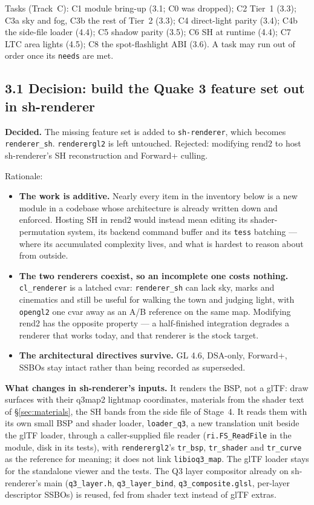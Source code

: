 \documentclass[11pt,a4paper]{article}
\begin{document}
Tasks (Track~C): C1 module bring-up (3.1; C0 was dropped); C2 Tier~1 (3.3); C3a sky and fog, C3b the
rest of Tier~2 (3.3); C4 direct-light parity (3.4); C4b the side-file loader (4.4); C5 shadow parity
(3.5); C6 SH at runtime (4.4); C7 LTC area lights (4.5); C8 the spot-flashlight ABI (3.6). A task
may run out of order once its \texttt{needs} are met.

\subsection{3.1 Decision: build the Quake 3 feature set out in sh-renderer}

\textbf{Decided.} The missing feature set is added to \texttt{sh-renderer}, which becomes
\texttt{renderer\_sh}. \texttt{renderergl2} is left untouched. Rejected: modifying rend2 to host
sh-renderer's SH reconstruction and Forward+ culling.

Rationale:
\begin{itemize}
\item \textbf{The work is additive.} Nearly every item in the inventory below is a new module in a
  codebase whose architecture is already written down and enforced. Hosting SH in rend2 would
  instead mean editing its shader-permutation system, its backend command buffer and its
  \texttt{tess} batching --- where its accumulated complexity lives, and what is hardest to reason
  about from outside.
\item \textbf{The two renderers coexist, so an incomplete one costs nothing.}
  \texttt{cl\_renderer} is a latched cvar: \texttt{renderer\_sh} can lack sky, marks and
  cinematics and still be useful for walking the town and judging light, with \texttt{opengl2} one
  cvar away as an A/B reference on the same map. Modifying rend2 has the opposite property --- a
  half-finished integration degrades a renderer that works today, and that renderer is the stock
  target.
\item \textbf{The architectural directives survive.} GL 4.6, DSA-only, Forward+, SSBOs stay intact
  rather than being recorded as superseded.
\end{itemize}

\textbf{What changes in sh-renderer's inputs.} It renders the BSP, not a glTF: draw surfaces with
their q3map2 lightmap coordinates, materials from the shader text of §\ref{sec:materials}, the SH
bands from the side file of Stage~4. It reads them with its own small BSP and shader loader,
\texttt{loader\_q3}, a new translation unit beside the glTF loader, through a caller-supplied file
reader (\texttt{ri.FS\_ReadFile} in the module, disk in its tests), with \texttt{renderergl2}'s \texttt{tr\_bsp},
\texttt{tr\_shader} and \texttt{tr\_curve} as the reference for meaning; it does not link
\texttt{libioq3\_map}. The glTF loader stays for the standalone viewer and the tests. The Q3 layer
compositor already on sh-renderer's main
(\texttt{q3\_layer.h}, \texttt{q3\_layer\_bind}, \texttt{q3\_composite.glsl}, per-layer
descriptor SSBOs) is reused, fed from shader text instead of glTF extras.
\end{document}
